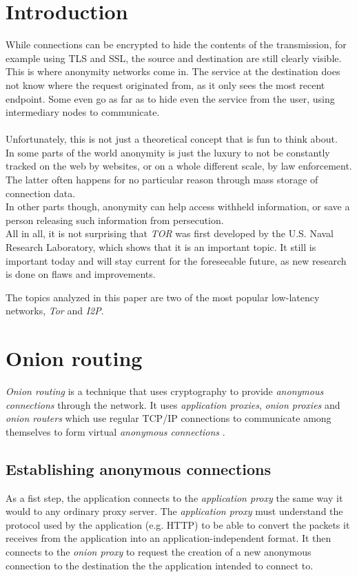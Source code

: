 \documentclass{sig-alternate}
\begin{document}
\section{Introduction}
While connections can be encrypted to hide the contents of the transmission, for example using TLS and SSL, the source and destination are still clearly visible.
\\
This is where anonymity networks come in.
The service at the destination does not know where the request originated from, as it only sees the most recent endpoint.
Some even go as far as to hide even the service from the user, using intermediary nodes to communicate.
\\
\\
Unfortunately, this is not just a theoretical concept that is fun to think about.
\\
In some parts of the world anonymity is just the luxury to not be constantly tracked on the web by websites, or on a whole different scale, by law enforcement.
The latter often happens for no particular reason through mass storage of connection data.
\\
In other parts though, anonymity can help access withheld information, or save a person releasing such information from persecution.
\\
All in all, it is not surprising that \emph{TOR} was first developed by the U.S. Naval Research Laboratory, which shows that it is an important topic.
It still is important today and will stay current for the foreseeable future, as new research is done on flaws and improvements\cite{craven2010}.

The topics analyzed in this paper are two of the most popular low-latency networks, \emph{Tor} and \emph{I2P}.

\section{Onion routing}
\emph{Onion routing} is a technique that uses cryptography to provide \emph{anonymous connections}
through the network. It uses \emph{application proxies}, \emph{onion proxies} and
\emph{onion routers} which use regular TCP/IP connections to communicate among themselves
to form virtual \emph{anonymous connections} \cite{reed1998}.

\subsection{Establishing anonymous connections}
As a fist step, the application connects to the \emph{application proxy} the same way it would to
any ordinary proxy server. The \emph{application proxy} must understand the protocol used by the
application (e.g. HTTP) to be able to convert the packets it receives from the application into an
application-independent format. It then connects to the \emph{onion proxy} to request the
creation of a new anonymous connection to the destination the the application intended to connect to.
\end{document}
